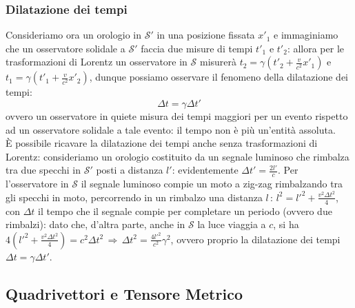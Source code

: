 \documentclass[]{article}
\begin{document}
\subsubsection{Dilatazione dei tempi}

Consideriamo ora un orologio in $ \mathcal{S}' $ in una posizione fissata $ x'_1 $ e immaginiamo che un osservatore solidale a $ \mathcal{S}' $ faccia due misure di tempi $ t'_1 $ e $ t'_2 $: allora per le trasformazioni di Lorentz un osservatore in $ \mathcal{S} $ misurerà $ t_2 = \gamma \left(t'_2 + \frac{v}{c^2} x'_1\right) $ e $ t_1 = \gamma \left(t'_1 + \frac{v}{c^2} x'_2\right) $, dunque possiamo osservare il fenomeno della dilatazione dei tempi:
\begin{equation}
	\Delta t = \gamma \Delta t'
	\label{eq:8}
\end{equation}
ovvero un osservatore in quiete misura dei tempi maggiori per un evento rispetto ad un osservatore solidale a tale evento: il tempo non è più un'entità assoluta. \\ 
%
È possibile ricavare la dilatazione dei tempi anche senza trasformazioni di Lorentz: consideriamo un orologio costituito da un segnale luminoso che rimbalza tra due specchi in $ \mathcal{S}' $ posti a distanza $ l' $: evidentemente $ \Delta t' = \frac{2l'}{c} $. Per l'osservatore in $ \mathcal{S} $ il segnale luminoso compie un moto a zig-zag rimbalzando tra gli specchi in moto, percorrendo in un rimbalzo una distanza $ l \,:\, l^2 = l'^2 + \frac{v^2 \Delta t^2}{4} $, con $ \Delta t $ il tempo che il segnale compie per completare un periodo (ovvero due rimbalzi): dato che, d'altra parte, anche in $ \mathcal{S} $ la luce viaggia a $ c $, si ha $ 4\left(l'^2 + \frac{v^2 \Delta t^2}{4}\right) = c^2 \Delta t^2 \, \Rightarrow \, \Delta t^2 = \frac{4l'^2}{c^2} \gamma^2 $, ovvero proprio la dilatazione dei tempi $ \Delta t = \gamma \Delta t' $.

\subsection{Quadrivettori e Tensore Metrico}
\end{document}
